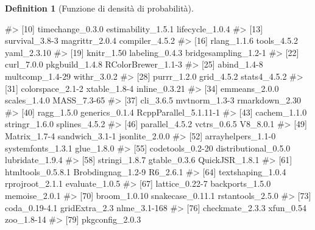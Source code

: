 \documentclass[
  letterpaper,
  DIV=11,
  numbers=noendperiod,
  oneside]{scrreprt}
\newenvironment{Shaded}{\begin{snugshade}}{\end{snugshade}}
\newcommand{\CommentTok}[1]{\textcolor[rgb]{0.37,0.37,0.37}{#1}}
\theoremstyle{definition}
\theoremstyle{plain}
\theoremstyle{definition}
\newtheorem{definition}{Definition}[chapter]
\theoremstyle{remark}
\begin{document}
\begin{definition}[Funzione di densità di
probabilità]
\begin{tcolorbox}
\begin{Shaded}
\begin{Highlighting}[]
\CommentTok{\#\textgreater{} [10] timechange\_0.3.0      estimability\_1.5.1    lifecycle\_1.0.4      }
\CommentTok{\#\textgreater{} [13] survival\_3.8{-}3        magrittr\_2.0.4        compiler\_4.5.2       }
\CommentTok{\#\textgreater{} [16] rlang\_1.1.6           tools\_4.5.2           yaml\_2.3.10          }
\CommentTok{\#\textgreater{} [19] knitr\_1.50            labeling\_0.4.3        bridgesampling\_1.2{-}1 }
\CommentTok{\#\textgreater{} [22] curl\_7.0.0            pkgbuild\_1.4.8        RColorBrewer\_1.1{-}3   }
\CommentTok{\#\textgreater{} [25] abind\_1.4{-}8           multcomp\_1.4{-}29       withr\_3.0.2          }
\CommentTok{\#\textgreater{} [28] purrr\_1.2.0           grid\_4.5.2            stats4\_4.5.2         }
\CommentTok{\#\textgreater{} [31] colorspace\_2.1{-}2      xtable\_1.8{-}4          inline\_0.3.21        }
\CommentTok{\#\textgreater{} [34] emmeans\_2.0.0         scales\_1.4.0          MASS\_7.3{-}65          }
\CommentTok{\#\textgreater{} [37] cli\_3.6.5             mvtnorm\_1.3{-}3         rmarkdown\_2.30       }
\CommentTok{\#\textgreater{} [40] ragg\_1.5.0            generics\_0.1.4        RcppParallel\_5.1.11{-}1}
\CommentTok{\#\textgreater{} [43] cachem\_1.1.0          stringr\_1.6.0         splines\_4.5.2        }
\CommentTok{\#\textgreater{} [46] parallel\_4.5.2        vctrs\_0.6.5           V8\_8.0.1             }
\CommentTok{\#\textgreater{} [49] Matrix\_1.7{-}4          sandwich\_3.1{-}1        jsonlite\_2.0.0       }
\CommentTok{\#\textgreater{} [52] arrayhelpers\_1.1{-}0    systemfonts\_1.3.1     glue\_1.8.0           }
\CommentTok{\#\textgreater{} [55] codetools\_0.2{-}20      distributional\_0.5.0  lubridate\_1.9.4      }
\CommentTok{\#\textgreater{} [58] stringi\_1.8.7         gtable\_0.3.6          QuickJSR\_1.8.1       }
\CommentTok{\#\textgreater{} [61] htmltools\_0.5.8.1     Brobdingnag\_1.2{-}9     R6\_2.6.1             }
\CommentTok{\#\textgreater{} [64] textshaping\_1.0.4     rprojroot\_2.1.1       evaluate\_1.0.5       }
\CommentTok{\#\textgreater{} [67] lattice\_0.22{-}7        backports\_1.5.0       memoise\_2.0.1        }
\CommentTok{\#\textgreater{} [70] broom\_1.0.10          snakecase\_0.11.1      rstantools\_2.5.0     }
\CommentTok{\#\textgreater{} [73] coda\_0.19{-}4.1         gridExtra\_2.3         nlme\_3.1{-}168         }
\CommentTok{\#\textgreater{} [76] checkmate\_2.3.3       xfun\_0.54             zoo\_1.8{-}14           }
\CommentTok{\#\textgreater{} [79] pkgconfig\_2.0.3}
\end{Highlighting}
\end{Shaded}


\end{tcolorbox}
\end{definition}
\end{document}
